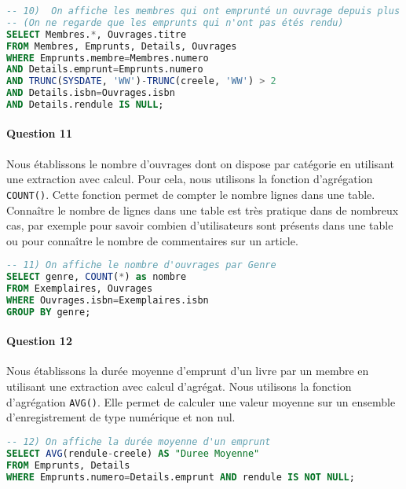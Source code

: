 \documentclass[10pt, oneside]{article}
\begin{document}
\begin{lstlisting}[language=sql, title=Question 10, label=QII10]
-- 10)  On affiche les membres qui ont emprunté un ouvrage depuis plus de 2 semaines et le titre de l'ouvrage 
-- (On ne regarde que les emprunts qui n'ont pas étés rendu)
SELECT Membres.*, Ouvrages.titre
FROM Membres, Emprunts, Details, Ouvrages
WHERE Emprunts.membre=Membres.numero
AND Details.emprunt=Emprunts.numero
AND TRUNC(SYSDATE, 'WW')-TRUNC(creele, 'WW') > 2
AND Details.isbn=Ouvrages.isbn
AND Details.rendule IS NULL;
\end{lstlisting}


\paragraph{Question 11} Nous établissons le nombre d'ouvrages dont on dispose par catégorie en utilisant une extraction avec calcul. Pour cela, nous utilisons la fonction d'agrégation \texttt{COUNT()}. Cette fonction permet de compter le nombre lignes dans une table. Connaître le nombre de lignes dans une table est très pratique dans de nombreux cas, par exemple pour savoir combien d'utilisateurs sont présents dans une table ou pour connaître le nombre de commentaires sur un article.

\begin{lstlisting}[language=sql, title=Question 11, label=QII11]
-- 11) On affiche le nombre d'ouvrages par Genre
SELECT genre, COUNT(*) as nombre
FROM Exemplaires, Ouvrages
WHERE Ouvrages.isbn=Exemplaires.isbn
GROUP BY genre;
\end{lstlisting}


\paragraph{Question 12} Nous établissons la durée moyenne d'emprunt d'un livre par un membre en utilisant une extraction avec calcul d'agrégat. Nous utilisons la fonction d'agrégation \texttt{AVG()}. Elle permet de calculer une valeur moyenne sur un ensemble d'enregistrement de type numérique et non nul.

\begin{lstlisting}[language=sql, title=Question 12, label=QII12]
-- 12) On affiche la durée moyenne d'un emprunt
SELECT AVG(rendule-creele) AS "Duree Moyenne"
FROM Emprunts, Details
WHERE Emprunts.numero=Details.emprunt AND rendule IS NOT NULL;
\end{lstlisting}
\end{document}
